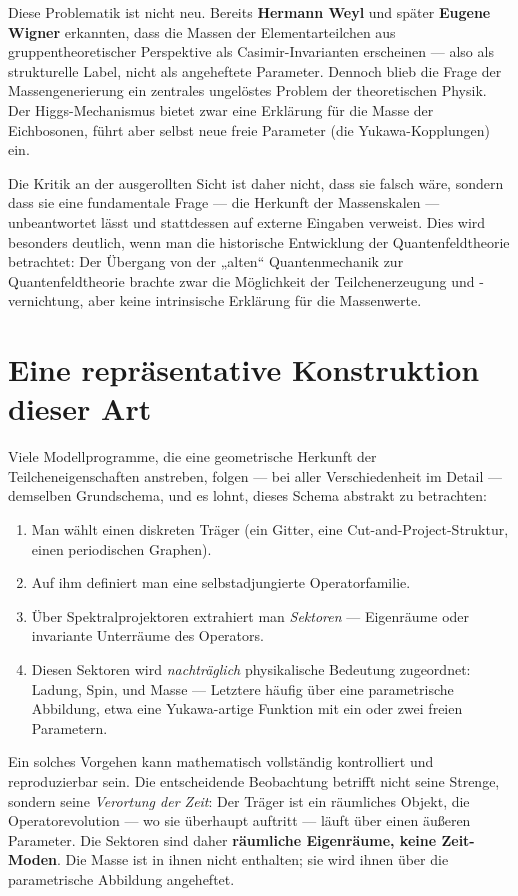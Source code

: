 Diese Problematik ist nicht neu. Bereits \textbf{Hermann Weyl} und später \textbf{Eugene Wigner} erkannten, dass die Massen der Elementarteilchen aus gruppentheoretischer Perspektive als Casimir-Invarianten erscheinen --- also als strukturelle Label, nicht als angeheftete Parameter. Dennoch blieb die Frage der Massengenerierung ein zentrales ungelöstes Problem der theoretischen Physik. Der Higgs-Mechanismus bietet zwar eine Erklärung für die Masse der Eichbosonen, führt aber selbst neue freie Parameter (die Yukawa-Kopplungen) ein.

Die Kritik an der ausgerollten Sicht ist daher nicht, dass sie falsch wäre, sondern dass sie eine fundamentale Frage --- die Herkunft der Massenskalen --- unbeantwortet lässt und stattdessen auf externe Eingaben verweist. Dies wird besonders deutlich, wenn man die historische Entwicklung der Quantenfeldtheorie betrachtet: Der Übergang von der „alten`` Quantenmechanik zur Quantenfeldtheorie brachte zwar die Möglichkeit der Teilchenerzeugung und -vernichtung, aber keine intrinsische Erklärung für die Massenwerte.

\section{Eine repräsentative Konstruktion dieser Art}

Viele Modellprogramme, die eine geometrische Herkunft der Teilcheneigenschaften anstreben, folgen --- bei aller Verschiedenheit im Detail --- demselben Grundschema, und es lohnt, dieses Schema abstrakt zu betrachten:

\begin{enumerate}[leftmargin=1.6em,itemsep=0.2em]
 \item Man wählt einen diskreten Träger (ein Gitter, eine Cut-and-Project-Struktur, einen periodischen Graphen).
 \item Auf ihm definiert man eine selbstadjungierte Operatorfamilie.
 \item Über Spektralprojektoren extrahiert man \emph{Sektoren} --- Eigenräume oder invariante Unterräume des Operators.
 \item Diesen Sektoren wird \emph{nachträglich} physikalische Bedeutung zugeordnet: Ladung, Spin, und Masse --- Letztere häufig über eine parametrische Abbildung, etwa eine Yukawa-artige Funktion mit ein oder zwei freien Parametern.
\end{enumerate}

Ein solches Vorgehen kann mathematisch vollständig kontrolliert und reproduzierbar sein. Die entscheidende Beobachtung betrifft nicht seine Strenge, sondern seine \emph{Verortung der Zeit}: Der Träger ist ein räumliches Objekt, die Operatorevolution --- wo sie überhaupt auftritt --- läuft über einen äußeren Parameter. Die Sektoren sind daher \textbf{räumliche Eigenräume, keine Zeit-Moden}. Die Masse ist in ihnen nicht enthalten; sie wird ihnen über die parametrische Abbildung angeheftet.

